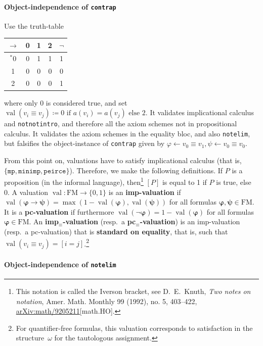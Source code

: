 \documentclass[11pt]{article}
\newcommand*{\define}[1]{\textbf{#1}}%
\renewcommand*{\phi}{\varphi}
\newcommand*{\FM}{\mathrm{FM}}
\DeclareMathOperator{\val}{val}
\theoremstyle{plain}
\theoremstyle{definition}
\theoremstyle{remark}
\begin{document}
\paragraph{Object-independence of \texttt{contrap}}

Use the truth-table
\begin{center}
\begin{tabular}{|c|ccc|c|}
\hline
$\to$&0&1&2&$\neg$\\
\hline
$^*$0\phantom{$^*$}&0&1&1&1\\
1&0&0&0&0\\
2&0&0&0&1\\
\hline
\end{tabular}
\end{center}
where only 0 is considered true, and set
$\val(v_i \equiv v_j) \coloneqq 0 \text{ if $a(v_i) = a(v_j)$ else } 2$.
It validates implicational calculus and \texttt{notnotintro}, and therefore all the axiom schemes
not in propositional calculus.
It validates the axiom schemes in the equality bloc, and also \texttt{notelim}, but falsifies the
object-instance of \texttt{contrap} given by
$\phi \leftarrow v_0 \equiv v_1, \psi \leftarrow v_0 \equiv v_0$.

\quad

From this point on, valuations have to satisfy implicational calculus (that is,
$\{\texttt{mp}, \texttt{minimp}, \texttt{peirce}\}$).
Therefore, we make the following definitions.
If $P$ is a proposition (in the informal language), then\footnote{This notation is called the
Iverson bracket, see D.\ E.\ Knuth, \textit{Two notes on notation}, Amer. Math. Monthly 99 (1992),
no. 5, 403--422, \href{https://arxiv.org/abs/math/9205211}{arXiv:math/9205211}[math.HO].}
$[P]$ is equal to 1 if $P$ is true, else 0.
A valuation $\val \colon \FM \to \{0, 1\}$ is an \define{imp-valuation} if
$\val(\bm\phi \to \bm\psi) = \max (1 - \val(\bm\phi), \val(\bm\psi))$ for all formulas
$\bm\phi, \bm\psi \in \FM$.
It is a \define{pc-valuation} if furthermore $\val(\neg \bm\phi) = 1 - \val(\bm\phi)$ for all
formulas $\bm\phi \in \FM$.
An \define{imp$_\equiv$-valuation} (resp.\ a \define{pc$_\equiv$-valuation}) is an imp-valuation
(resp.\ a pc-valuation) that is \define{standard on equality}, that is, such that
$\val(v_i \equiv v_j) = [i = j]$.\footnote{For quantifier-free formulas, this valuation
corresponds to satisfaction in the structure~$\omega$ for the tautologous assignment.}


\paragraph{Object-independence of \texttt{notelim}}
\end{document}
